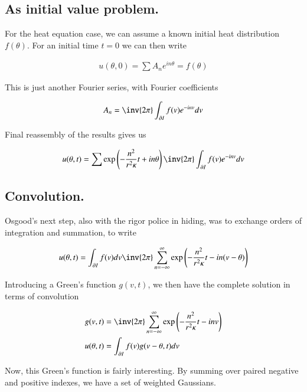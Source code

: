 \subsection{As initial value problem. }

For the heat equation case, we can assume a known initial heat distribution 
$f(\theta)$.
For an initial time $t=0$ we can then write

\begin{align*}
u(\theta, 0) = \sum A_n e^{i n \theta} = f(\theta)
\end{align*}

This is just another Fourier series, with Fourier coefficients

\begin{align*}
A_n = \inv{2\pi} \int_{\partial I} f(v) e^{-i n v} dv
\end{align*}

Final reassembly of the results gives us

\begin{align}
u(\theta, t) = \sum \exp\left(- \frac{n^2}{ r^2 \kappa } t + i n \theta\right) \inv{2\pi} \int_{\partial I} f(v) e^{-i n v} dv
\end{align}

\subsection{Convolution. }

Osgood's next step, also with the rigor police in hiding, was to exchange orders of integration and summation, to write

\begin{align*}
u(\theta, t) 
&= 
\int_{\partial I} f(v) dv \inv{2 \pi} \sum_{n=-\infty}^{\infty} \exp\left(- \frac{n^2}{ r^2 \kappa } t -i n (v -\theta)\right) \\
\end{align*}

Introducing a Green's function $g(v, t)$, we then have the complete solution in terms of convolution

\begin{align}\label{eqn:heat_fourier:seriesGreens}
g( v , t ) &= \inv{2 \pi} \sum_{n=-\infty}^\infty \exp\left(- \frac{n^2}{ r^2 \kappa } t -i n v \right) \\
u(\theta, t) &= \int_{\partial I} f(v) g(v - \theta, t) dv 
\end{align}

Now, this Green's function is fairly interesting.  By summing over paired negative and positive indexes, we have a set of weighted Gaussians.

